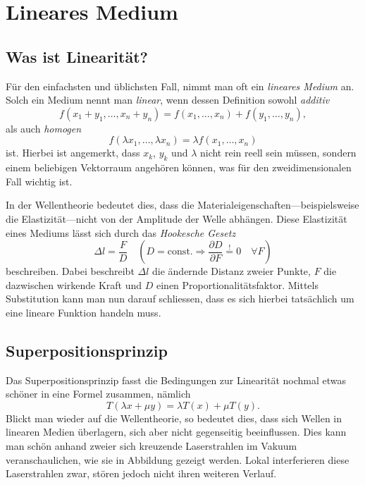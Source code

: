 %
%
%
%
\section{Lineares Medium\label{particles:section:linear}}

\subsection{Was ist Linearität?}
Für den einfachsten und üblichsten Fall, nimmt man oft ein \emph{lineares Medium} an.
Solch ein Medium nennt man \emph{linear}, wenn dessen Definition sowohl \emph{additiv}
\[
    f(x_{1} + y_{1}, \ldots, x_{n} + y_{n}) 
    = 
    f(x_{1}, \ldots, x_{n}) 
    + 
    f(y_{1}, \ldots, y_{n}),
\]
als auch \emph{homogen}
\[
    f(\lambda x_{1}, \ldots, \lambda x_{n}) 
    = 
    \lambda f(x_{1}, \ldots, x_{n})
\]
ist.
Hierbei ist angemerkt, dass $x_{k}$, $y_{k}$ und $\lambda$ nicht rein reell sein müssen, 
sondern einem beliebigen Vektorraum angehören können, 
was für den zweidimensionalen Fall wichtig ist.

In der Wellentheorie bedeutet dies, 
dass die Materialeigenschaften---beispielsweise die Elastizität---nicht von der Amplitude der Welle abhängen.
Diese Elastizität eines Mediums lässt sich durch das \emph{Hookesche Gesetz} 
\[
    \Delta l
    = 
    \frac{F}{D}
    \quad
    (D = \text{const.} 
    \Rightarrow 
    \frac{\partial D}{\partial F} 
    \overset{!}{=} 
    0 
    \quad 
    \forall F)
    \label{particles:eq:hookesches-gesetz}
\]
beschreiben.
Dabei beschreibt $\Delta l$ die ändernde Distanz zweier Punkte,
$F$ die dazwischen wirkende Kraft und $D$ einen Proportionalitätsfaktor.
Mittels Substitution kann man nun darauf schliessen, 
dass es sich hierbei tatsächlich um eine lineare Funktion handeln muss.


\subsection{Superpositionsprinzip}
Das Superpositionsprinzip fasst die Bedingungen zur Linearität nochmal etwas schöner in eine Formel zusammen, 
nämlich
\[
    T(\lambda x + \mu y)
    = 
    \lambda T(x) 
    + 
    \mu T(y).
\]
Blickt man wieder auf die Wellentheorie, so bedeutet dies, 
dass sich Wellen in linearen Medien überlagern, 
sich aber nicht gegenseitig beeinflussen.
Dies kann man schön anhand zweier sich kreuzende Laserstrahlen im Vakuum veranschaulichen, 
wie sie in Abbildung  gezeigt werden.
Lokal interferieren diese Laserstrahlen zwar, stören jedoch nicht ihren weiteren Verlauf. 

